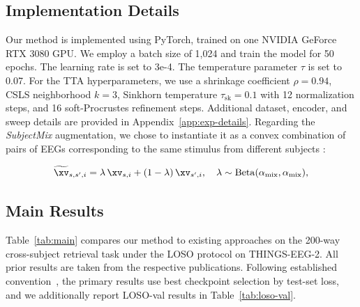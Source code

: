 \documentclass{article}
\begin{document}
\subsection{Implementation Details}
\label{sec:implementation}

Our method is implemented using PyTorch, trained on one NVIDIA GeForce RTX 3080 GPU. We employ a batch size of 1,024 and train the model for 50 epochs. The learning rate is set to 3e-4. The temperature parameter $\tau$ is set to 0.07. For the TTA hyperparameters, we use a shrinkage coefficient $\rho = 0.94$, CSLS neighborhood $k=3$, Sinkhorn temperature $\tau_{\mathrm{sk}}=0.1$ with 12 normalization steps, and 16 soft-Procrustes refinement steps. Additional dataset, encoder, and sweep details are provided in Appendix~\ref{app:exp-details}. Regarding the \emph{SubjectMix} augmentation, we chose to instantiate it as a convex combination of pairs of  EEGs corresponding to the same stimulus from different subjects :

\vspace{-4pt}
\begin{equation}\label{eq:subjmix}
  \widetilde{\xv}_{s,s',i} = \lambda\,\xv_{s,i} + (1 - \lambda)\,\xv_{s',i}, 
  \quad \lambda \sim \mathrm{Beta}(\alpha_{\mathrm{mix}}, \alpha_{\mathrm{mix}}),
\end{equation}

\subsection{Main Results}
\label{sec:main-results}

Table~\ref{tab:main} compares our method to existing approaches on the 200-way cross-subject retrieval task under the LOSO protocol on THINGS-EEG-2.
All prior results are taken from the respective publications.
Following established convention~\cite{zhang2025neurobridge,du2025shallow,huang2026sattc}, the primary results use best checkpoint selection by test-set loss, and we additionally report LOSO-val results in Table~\ref{tab:loso-val}.
\end{document}
